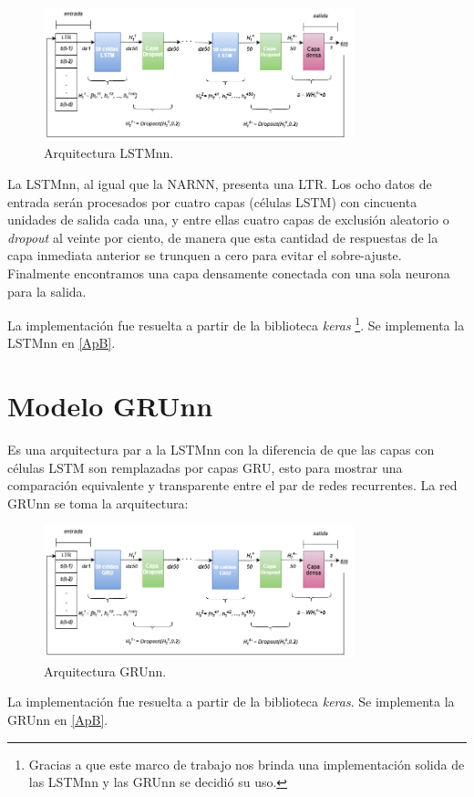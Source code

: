 \begin{figure}[H]
    \centering
    \includegraphics[width=0.8\textwidth]{Figuras/construccion_del_modelo/LSTMnn_arquitectura.png}
    \caption{Arquitectura LSTMnn.} 
    \label{fig:arquitectura_LSTMnn}
\end{figure}

La LSTMnn, al igual que la NARNN, presenta una LTR. Los ocho datos de entrada serán procesados por cuatro capas (células LSTM) con cincuenta unidades de salida cada una, y entre ellas cuatro capas de exclusión aleatorio o \textit{dropout} al veinte por ciento, de manera que esta cantidad de respuestas de la capa inmediata anterior se trunquen a cero para evitar el sobre-ajuste. Finalmente encontramos una capa densamente conectada con una sola neurona para la salida.

La implementación fue resuelta a partir de la biblioteca \textit{keras} \footnote{Gracias a que este marco de trabajo nos brinda una implementación solida de las LSTMnn y las GRUnn se decidió su uso.}. Se implementa la LSTMnn en \ref{ApB}.

\section{Modelo GRUnn}

Es una arquitectura par a la LSTMnn con la diferencia de que las capas con células LSTM son remplazadas por capas GRU, esto para mostrar una comparación equivalente y transparente entre el par de redes recurrentes. La red GRUnn se toma la arquitectura:

\begin{figure}[H]
    \centering
    \includegraphics[width=0.8\textwidth]{Figuras/construccion_del_modelo/GRUnn_arquitectura.png}
    \caption{Arquitectura GRUnn.} 
    \label{fig:arquitectura_GRUnn} 
\end{figure}

La implementación fue resuelta a partir de la biblioteca \textit{keras}. Se implementa la GRUnn en \ref{ApB}.




